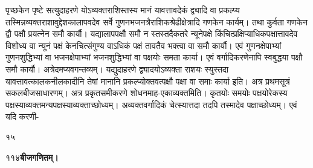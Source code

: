 \documentclass[11pt, openany]{book}
\begin{document}
\begin{sloppypar}
\hangindent=0.2in \hspace{0.2in}पृच्छकेन पृष्टे सत्युदाहरणे योऽव्यक्तराशिस्तस्य मानं यावत्तावदेकं द्व्यादि वा प्रकल्प्य तस्मिन्नव्यक्तराशावुद्देशकालापवदेव सर्वे गुणनभजनत्रैराशिकश्रेढीक्षेत्रादि गणकेन कार्यम्। तथा कुर्वता गणकेन द्वौ पक्षौ प्रयत्नेन समौ कार्यौ। यद्यालापपक्षौ समौ न स्तस्तदैकतरे न्यूनेपक्षे किंचित्प्रक्षिप्याधिकपक्षात्तावदेव विशोध्य वा न्यूनं पक्षं केनचित्संगुण्य वाऽधिकं पक्षं तावतैव भक्त्वा वा समौ कार्यौ। एवं गुणनक्षेपाभ्यां गुणनशुद्धिभ्यां वा भजनक्षेपाभ्यां भजनशुद्धिभ्यां वा पक्षयोः समता कार्या। एवं वर्गादिकरणेनापि स्वबुद्धया पक्षौ समौ कार्यौ। अत्रेदमप्यवगन्तव्यम्। यद्युदाहरणे द्व्यादयोऽव्यक्ता राशयः स्युस्तदा यावत्तावत्कालकनीलकादीनि तेषां मानानि प्रकल्प्योक्तवत्पक्षौ पक्षा वा समाः कार्या इति। अत्र प्रथमसूत्रं सकलबीजसाधारणम्। अत्र प्रकृतसमीकरणे शोधनमाह-एकाव्यक्तमिति। कृतयोः समयोः पक्षयोरेकस्य पक्षस्याव्यक्तमन्यपक्षस्याव्यक्ताच्छोध्यम्। अव्यक्तवर्गादिकं चेत्स्यात्तदा तदपि तस्मादेव पक्षाच्छोध्यम्। एवं यदि करणी-

 १५
\end{sloppypar}
\thispagestyle{empty}
\newpage

\onehalfspacing
११४\hspace{2in}\textbf{बीजगणितम्।} 

\vspace{5mm}
\end{document}
